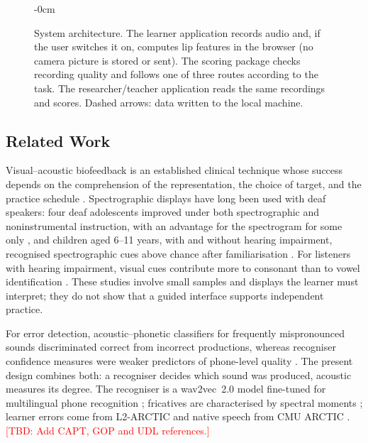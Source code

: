 \documentclass[engproc,article,submit,moreauthors]{Definitions/mdpi}
\newcommand{\tbd}[1]{\textcolor{red}{[TBD: #1]}}
\begin{document}
\begin{figure}[!t]
\begin{adjustwidth}{-\extralength}{0cm}
{}
\end{adjustwidth}
\caption{System architecture. The learner application records audio and, if the user switches it on, computes lip features in the browser (no camera picture is stored or sent). The scoring package checks recording quality and follows one of three routes according to the task. The researcher/teacher application reads the same recordings and scores. Dashed arrows: data written to the local machine.}
\label{fig:arch}
\end{figure}

\subsection{Related Work}
Visual--acoustic biofeedback is an established clinical technique whose success depends on the comprehension of the representation, the choice of target, and the practice schedule \cite{hitchcock2023}. Spectrographic displays have long been used with deaf speakers: four deaf adolescents improved under both spectrographic and noninstrumental instruction, with an advantage for the spectrogram for some only \cite{ertmermaki2000}, and children aged 6--11 years, with and without hearing impairment, recognised spectrographic cues above chance after familiarisation \cite{ertmer2004}. For listeners with hearing impairment, visual cues contribute more to consonant than to vowel identification \cite{moradi2017,desai2008}. These studies involve small samples and displays the learner must interpret; they do not show that a guided interface supports independent practice.

For error detection, acoustic--phonetic classifiers for frequently mispronounced sounds discriminated correct from incorrect productions, whereas recogniser confidence measures were weaker predictors of phone-level quality \cite{truong2005}. The present design combines both: a recogniser decides which sound was produced, acoustic measures its degree. The recogniser is a wav2vec~2.0 model \cite{baevski2020} fine-tuned for multilingual phone recognition \cite{xu2022}; fricatives are characterised by spectral moments \cite{jongman2000}; learner errors come from L2-ARCTIC \cite{zhao2018} and native speech from CMU ARCTIC \cite{kominek2004}. \tbd{Add CAPT, GOP and UDL references.}
\end{document}
